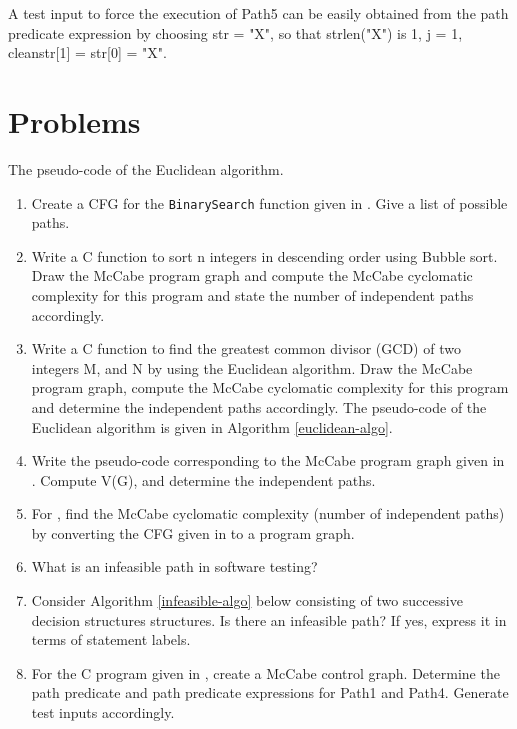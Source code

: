 A test input to force the execution of Path5 can be easily obtained from the path predicate expression by choosing str = "X", so that strlen("X") is 1, j = 1, cleanstr[1] = str[0] = "X". 

\section{Problems}

\begin{algorithm}
\DontPrintSemicolon
{}


\caption{The pseudo-code of the Euclidean algorithm.}
\label{euclidean-algo}
\end{algorithm}

\begin{enumerate}
    \item Create a CFG for the \lstinline!BinarySearch! function given in . Give a list of possible paths.
    \item Write a C function to sort n integers in descending order using Bubble sort. Draw the McCabe program graph and compute the McCabe cyclomatic complexity for this program and state the number of independent paths accordingly.
    \item Write a C function to find the greatest common divisor (GCD) of two integers M, and N by using the Euclidean algorithm. Draw the McCabe program graph, compute the McCabe cyclomatic complexity for this program and determine the independent paths accordingly.
    The pseudo-code of the Euclidean algorithm is given in Algorithm \ref{euclidean-algo}.
    \item Write the pseudo-code corresponding to the McCabe program graph given in . Compute V(G), and determine the independent paths.
    \item For , find the McCabe cyclomatic complexity (number of independent paths) by converting the CFG given in  to a program graph.
    \item What is an infeasible path in software testing?
    \item Consider Algorithm \ref{infeasible-algo} below consisting of two successive decision structures structures. Is there an infeasible path? If yes, express it in terms of statement labels.
    \item For the C program given in , create a McCabe control graph. Determine the path predicate and path predicate expressions for Path1 and Path4. Generate test inputs accordingly.
\end{enumerate}

